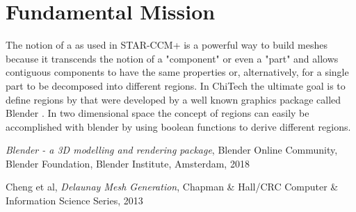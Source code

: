 \documentclass[11pt,letterpaper,titlepage]{article}
\begin{document}
\pagestyle{fancy}
\cfoot{}
\lfoot{\truncate{14cm}{\NSCDOCTITLE}}
\rhead{}
\chead{\currentname}
\lhead{}
\renewcommand{\footrulewidth}{0.4pt}
\tableofcontents
{}

\listoffigures
\listoftables
{}


\newpage
{}
\section{Fundamental Mission}
The notion of a  as used in STAR-CCM+ is a powerful way to build meshes because it transcends the notion of a "component" or even a "part" and allows contiguous components to have the same properties or, alternatively, for a single part to be decomposed into different regions. In ChiTech the ultimate goal is to define regions by  that were developed by a well known graphics package called Blender \cite{blender}.
\newline
\newline
In two dimensional space the concept of regions can easily be accomplished with blender by using boolean functions to derive different regions.

\newpage
{}
\begin{thebibliography}{1}

	 {\em Blender - a 3D modelling and rendering package}, Blender Online Community, Blender Foundation, Blender Institute, Amsterdam, 2018
	
	 Cheng et al, {\em Delaunay Mesh Generation}, Chapman \& Hall/CRC Computer \& Information Science Series, 2013
	
	
\end{thebibliography}
\end{document}
